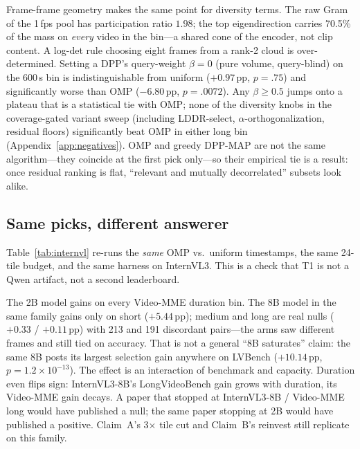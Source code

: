\documentclass[11pt]{article}
\begin{document}
Frame-frame geometry makes the same point for diversity terms.
The raw Gram of the 1\,fps pool has participation ratio $1.98$; the top eigendirection carries 70.5\% of the mass on \emph{every} video in the bin---a shared cone of the encoder, not clip content.
A log-det rule choosing eight frames from a rank-2 cloud is over-determined.
Setting a DPP's query-weight $\beta{=}0$ (pure volume, query-blind) on the 600\,s bin is indistinguishable from uniform (${+}0.97$\,pp, $p{=}.75$) and significantly worse than OMP (${-}6.80$\,pp, $p{=}.0072$).
Any $\beta{\ge}0.5$ jumps onto a plateau that is a statistical tie with OMP; none of the diversity knobs in the coverage-gated variant sweep (including LDDR-select, $\alpha$-orthogonalization, residual floors) significantly beat OMP in either long bin (Appendix~\ref{app:negatives}).
OMP and greedy DPP-MAP are not the same algorithm---they coincide at the first pick only---so their empirical tie is a result: once residual ranking is flat, ``relevant and mutually decorrelated'' subsets look alike.

\subsection{Same picks, different answerer}
\label{sec:internvl}

Table~\ref{tab:internvl} re-runs the \emph{same} OMP vs.\ uniform timestamps, the same 24-tile budget, and the same harness on InternVL3.
This is a check that T1 is not a Qwen artifact, not a second leaderboard.

The 2B model gains on every Video-MME duration bin.
The 8B model in the same family gains only on short (${+}5.44$\,pp); medium and long are real nulls ($+0.33$ / $+0.11$\,pp) with 213 and 191 discordant pairs---the arms saw different frames and still tied on accuracy.
That is not a general ``8B saturates'' claim: the same 8B posts its largest selection gain anywhere on LVBench (${+}10.14$\,pp, $p{=}1.2{\times}10^{-13}$).
The effect is an interaction of benchmark and capacity.
Duration even flips sign: InternVL3-8B's LongVideoBench gain grows with duration, its Video-MME gain decays.
A paper that stopped at InternVL3-8B / Video-MME long would have published a null; the same paper stopping at 2B would have published a positive.
Claim~A's 3$\times$ tile cut and Claim~B's reinvest still replicate on this family.
\end{document}
